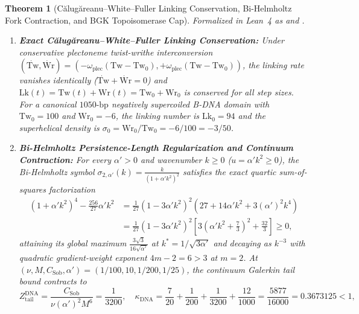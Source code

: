\documentclass[11pt,a4paper]{article}
\newtheorem{theorem}{Theorem}[section]
\theoremstyle{definition}
\begin{document}
\begin{theorem}[C\u{a}lug\u{a}reanu--White--Fuller Linking Conservation, Bi-Helmholtz Fork Contraction, and BGK Topoisomerase Cap]
\label{thm:calugareanu_bihelmholtz}
Formalized in Lean~4 as  and .
\begin{enumerate}
  \item \textbf{Exact C\u{a}lug\u{a}reanu--White--Fuller Linking Conservation:} Under conservative plectoneme twist-writhe interconversion $(\dot{\mathrm{Tw}}, \dot{\mathrm{Wr}}) = (-\omega_{\mathrm{plec}}(\mathrm{Tw} - \mathrm{Tw}_0), +\omega_{\mathrm{plec}}(\mathrm{Tw} - \mathrm{Tw}_0))$, the linking rate vanishes identically ($\dot{\mathrm{Tw}} + \dot{\mathrm{Wr}} = 0$) and $\mathrm{Lk}(t) = \mathrm{Tw}(t) + \mathrm{Wr}(t) = \mathrm{Tw}_0 + \mathrm{Wr}_0$ is conserved for all step sizes. For a canonical $1050\text{-bp}$ negatively supercoiled B-DNA domain with $\mathrm{Tw}_0 = 100$ and $\mathrm{Wr}_0 = -6$, the linking number is $\mathrm{Lk}_0 = 94$ and the superhelical density is $\sigma_0 = \mathrm{Wr}_0/\mathrm{Tw}_0 = -6/100 = -3/50$.
  \item \textbf{Bi-Helmholtz Persistence-Length Regularization and Continuum Contraction:} For every $\alpha' > 0$ and wavenumber $k \ge 0$ ($u = \alpha' k^2 \ge 0$), the Bi-Helmholtz symbol $\sigma_{2,\alpha'}(k) = \frac{k}{(1+\alpha' k^2)^2}$ satisfies the exact quartic sum-of-squares factorization
  \begin{equation}
  \begin{aligned}
    (1 + \alpha' k^2)^4 - \frac{256}{27}\alpha' k^2
    &= \frac{1}{27}\left(1 - 3\alpha' k^2\right)^2 \left(27 + 14\alpha' k^2 + 3(\alpha')^2 k^4\right) \\
    &= \frac{1}{27}\left(1 - 3\alpha' k^2\right)^2 \left[3\left(\alpha' k^2 + \frac{7}{3}\right)^2 + \frac{32}{3}\right] \ge 0,
  \end{aligned}
  \end{equation}
  attaining its global maximum $\frac{3\sqrt{3}}{16\sqrt{\alpha'}}$ at $k^* = 1/\sqrt{3\alpha'}$ and decaying as $k^{-3}$ with quadratic gradient-weight exponent $4m - 2 = 6 > 3$ at $m=2$. At $(\nu, M, C_{\mathrm{Sob}}, \alpha') = (1/100, 10, 1/200, 1/25)$, the continuum Galerkin tail bound contracts to
  \begin{equation}
    Z_{\mathrm{tail}}^{\mathrm{DNA}} = \frac{C_{\mathrm{Sob}}}{\nu (\alpha')^2 M^6} = \frac{1}{3200}, \quad
    \kappa_{\mathrm{DNA}} = \frac{7}{20} + \frac{1}{200} + \frac{1}{3200} + \frac{12}{1000} = \frac{5877}{16000} = 0.3673125 < 1,

\end{equation}
\end{enumerate}
\end{theorem}
\end{document}
